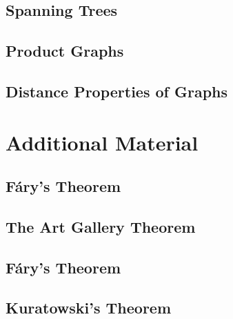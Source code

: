         \subsection{Spanning Trees}
        \subsection{Product Graphs}
        \subsection{Distance Properties of Graphs}
    \section{Additional Material}
        \subsection{F\'{a}ry's Theorem}
        \subsection{The Art Gallery Theorem}
        \subsection{F\'{a}ry's Theorem}
        \subsection{Kuratowski's Theorem}
